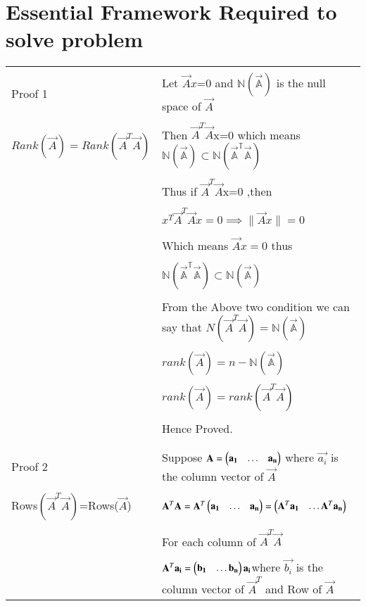 \documentclass[journal,12pt]{IEEEtran}
\begin{document}
\section{\textbf{Essential Framework Required to solve problem }}
\renewcommand{\thetable}{1}
\begin{longtable}{|l|l|}
	\hline
	\multirow{3}{*}{Proof 1}	& \\
	&Let $\vec{A}x$=0 and $\mathbb{N(\vec{A})}$ is the null space of $\vec{A}$\\
	&\\
	$Rank(\vec{A})=Rank(\vec{A}^T\vec{A})$&Then $\vec{A}^T\vec{A}$x=0 which means $\mathbb{N(\vec{A})}\subset \mathbb{N(\vec{A}^T\vec{A})}$ \\
	&\\
	&Thus if $\vec{A}^T\vec{A}$x=0 ,then\\
	&\\
	&$x^T\vec{A}^T\vec{A}x=0\implies\lVert\vec{A}x\rVert=0$\\
	&\\
	&Which means $\vec{A}x=0$ thus\\
	&\\
	& $\mathbb{N(\vec{A}^T\vec{A})}\subset\mathbb{N(\vec{A})}$\\
	&\\
	&From the Above two condition we can say that ${N(\vec{A}^T\vec{A})}=\mathbb{N(\vec{A})}$\\
	&\\
	&$rank(\vec{A})=n-\mathbb{N(\vec{A})}$\\
	&\\
	&$rank(\vec{A})=rank(\vec{A}^T\vec{A})$\\
	&\\
	&Hence Proved.\\
	&\\
	\hline
	\multirow{3}{*}{Proof 2} 
	&\\
	&Suppose $\mathbf{A}=\begin{pmatrix}\mathbf{a_1}&\hdots&\mathbf{a_n}\end{pmatrix}$ where $\vec{a_i}$ is the column vector of $\vec{A}$\\
	&\\
	Rows$(\vec{A}^T\vec{A})$=Rows($\vec{A}$) & $\mathbf{A}^T\mathbf{A}=\mathbf{A}^T\begin{pmatrix}\mathbf{a_1}&\hdots&\mathbf{a_n}\end{pmatrix}=\begin{pmatrix}\mathbf{A}^T\mathbf{a_1}&\hdots\mathbf{A}^T\mathbf{a_n}\end{pmatrix}$\\
	&\\
	&For each column of $\vec{A}^T\vec{A}$\\
	&\\
	&$\mathbf{A}^T\mathbf{a_i}=\begin{pmatrix}\mathbf{b_1}&\hdots\mathbf{b_n}\end{pmatrix}\mathbf{a_i}$where $\vec{b_i}$ is the column vector of $\vec{A}^T$ and Row of $\vec{A}$\\

\end{longtable}
\end{document}
